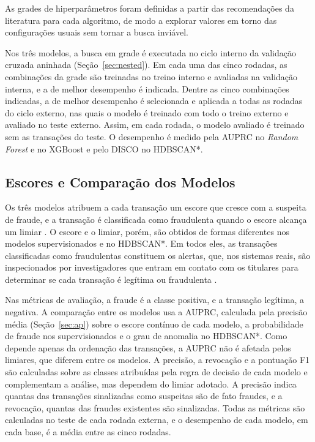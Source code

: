 \documentclass{uflamon}          %
\begin{document}
As grades de hiperparâmetros foram definidas a partir das recomendações da literatura para cada algoritmo, de modo a explorar valores em torno das configurações usuais sem tornar a busca inviável.

Nos três modelos, a busca em grade é executada no ciclo interno da validação cruzada aninhada (Seção~\ref{sec:nested}). Em cada uma das cinco rodadas, as combinações da grade são treinadas no treino interno e avaliadas na validação interna, e a de melhor desempenho é indicada. Dentre as cinco combinações indicadas, a de melhor desempenho é selecionada e aplicada a todas as rodadas do ciclo externo, nas quais o modelo é treinado com todo o treino externo e avaliado no teste externo. Assim, em cada rodada, o modelo avaliado é treinado sem as transações do teste. O desempenho é medido pela AUPRC no \textit{Random Forest} e no XGBoost e pelo DISCO no HDBSCAN*.

\subsection{Escores e Comparação dos Modelos}
\label{sec:comparacao}

Os três modelos atribuem a cada transação um escore que cresce com a suspeita de fraude, e a transação é classificada como fraudulenta quando o escore alcança um limiar \cite{fawcett2006}. O escore e o limiar, porém, são obtidos de formas diferentes nos modelos supervisionados e no HDBSCAN*. Em todos eles, as transações classificadas como fraudulentas constituem os alertas, que, nos sistemas reais, são inspecionados por investigadores que entram em contato com os titulares para determinar se cada transação é legítima ou fraudulenta \cite{dalpozzolo2018}.

Nas métricas de avaliação, a fraude é a classe positiva, e a transação legítima, a negativa. A comparação entre os modelos usa a AUPRC, calculada pela precisão média (Seção~\ref{sec:ap}) sobre o escore contínuo de cada modelo, a probabilidade de fraude nos supervisionados e o grau de anomalia no HDBSCAN*. Como depende apenas da ordenação das transações, a AUPRC não é afetada pelos limiares, que diferem entre os modelos. A precisão, a revocação e a pontuação F1 são calculadas sobre as classes atribuídas pela regra de decisão de cada modelo e complementam a análise, mas dependem do limiar adotado. A precisão indica quantas das transações sinalizadas como suspeitas são de fato fraudes, e a revocação, quantas das fraudes existentes são sinalizadas. Todas as métricas são calculadas no teste de cada rodada externa, e o desempenho de cada modelo, em cada base, é a média entre as cinco rodadas.
\end{document}
